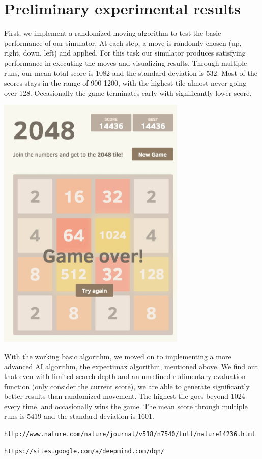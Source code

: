 \documentclass[11pt]{article}
\begin{document}
\section{Preliminary experimental results}

First, we implement a randomized moving algorithm to test the basic performance of our simulator. At each step, a move is randomly chosen (up, right, down, left) and applied. For this task our simulator produces satisfying performance in executing the moves and visualizing results. Through multiple runs, our mean total score is 1082 and the standard deviation is 532. Most of the scores stays in the range of 900-1200, with the highest tile almost never going over 128. Occasionally the game terminates early with significantly lower score.

\begin{centering}

\includegraphics[width=90mm]{2048_screenshot2.jpg}

\end{centering}

With the working basic algorithm, we moved on to implementing a more advanced AI algorithm, the expectimax algorithm, mentioned above. We find out that even with limited search depth and an unrefined rudimentary evaluation function (only consider the current score), we are able to generate significantly better results than randomized movement. The highest tile goes beyond 1024 every time, and occasionally wins the game. The mean score through multiple runs is 5419 and the standard deviation is 1601.

\begin{thebibliography}{9}

 \texttt{http://www.nature.com/nature/journal/v518/n7540/full/nature14236.html}

 \texttt{https://sites.google.com/a/deepmind.com/dqn/}

\end{thebibliography}
\end{document}
